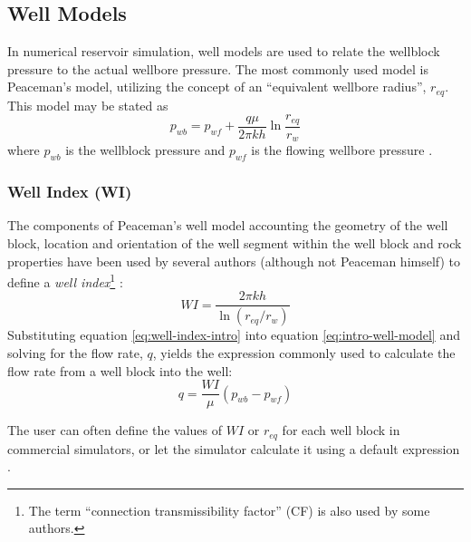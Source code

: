 \subsection{Well Models} %
\label{sub:well_models}
In numerical reservoir simulation, well models are used to relate the wellblock pressure to the actual wellbore pressure. The most commonly used model is Peaceman's model, utilizing the concept of an ``equivalent wellbore radius'', $r_{eq}$. This model may be stated as
\begin{equation}
    \label{eq:intro-well-model}
    p_{wb} = p_{wf} + \frac{q\mu}{2\pi k h} \ln \frac{r_{eq}}{r_{w}}
\end{equation}
where $p_{wb}$ is the wellblock pressure and $p_{wf}$ is the flowing wellbore pressure \cite{Peaceman1990Interpretation}.

\subsubsection{Well Index (WI)} %
\label{ssub:well_index_}
The components of Peaceman's well model accounting the geometry of the well block, location and orientation of the well segment within the well block and rock properties have been used by several authors (although not Peaceman himself) to define a \emph{well index}\footnote{The term ``connection transmissibility factor'' (CF) is also used by some authors\cite{Peaceman2003New,Schlumberger2013Eclipse}.} \cite{Wolfsteiner2003Calculation}:
\begin{equation}
    \label{eq:well-index-intro}
    WI = \frac{2\pi kh}{\ln \left(r_{eq}/r_{w}\right)}
\end{equation}
Substituting equation \eqref{eq:well-index-intro} into equation \eqref{eq:intro-well-model} and solving for the flow rate, $q$, yields the expression commonly used to calculate the flow rate from a well block into the well:
\begin{equation}
    \label{eq:wolfsteiner-well-index-multiple-blocks}
    q = \frac{WI}{\mu} \left( p_{wb} - p_{wf} \right)
\end{equation}

The user can often define the values of $WI$ or $r_{eq}$ for each well block in commercial simulators, or let the simulator calculate it using a default expression \cite{Peaceman2003New}.

